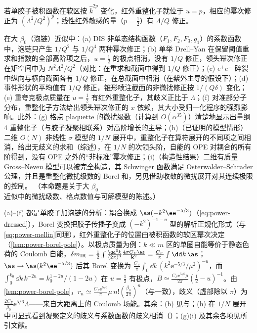 若单胶子被积函数在软区按 $\hat k^{2p}$ 变化，红外重整化子就位于 $u=p$，相应的幂次修正为 $(\Lambda^2/Q^2)^p$；线性红外敏感的量（$p=\frac12$）有 $\Lambda/Q$ 修正。

\begin{proposition}\label{prop:power-renormalon-examples}
在大 $\beta_0$（泡链）近似中：(a) DIS 非单态结构函数（$F_1,F_2,F_3,g_1$）的系数函数中，泡链只产生 $1/Q^2$ 与 $1/Q^4$ 两种幂次修正\cite{DasguptaWebber1996}；(b) 单举 Drell--Yan 在保留阈值重求和指数的全部高阶项之后，$u=\frac12$ 的极点相消，没有 $1/Q$ 修正，领头幂次修正在矩空间中为 $N^2\Lambda^2/Q^2$\cite{BenekeBraun1995b}（对比：\cite{Korchemsky:1994is}在重求和截面中得到 $1/Q$ 修正）；(c) $e^+e^-$ 碎裂中纵向与横向截面各有 $1/Q$ 修正，在总截面中相消（在紫外主导的假设下）\cite{BenekeBraunMagnea1997}；(d) 事件形状的平均值有 $1/Q$ 修正\cite{DokshitzerWebber1995}，锥形喷注截面的非微扰修正按 $1/(Q\delta)$ 变化\cite{Korchemsky:1994is}；(e) 重夸克极点质量在 $u=\frac12$ 有红外重整化子，其歧义正比于 $\Lambda$\cite{Bigi:1994em,Beneke:1994sw}；(f) 对准部分子分布，重整化子方法给出领头幂次修正的 $x$ 依赖，其大小受归一化程序的强烈影响\cite{Braun:2018brg}。此外：(g) 格点 plaquette 的微扰级数（计算到 $O(\alpha^{35})$）清楚地显示出量纲 4 重整化子（与胶子凝聚相联系）对高阶增长的主导\cite{Bali:2014fea}；(h)（已证明的模型情形）二维 $O(N)$ 非线性 $\sigma$ 模型的 $1/N$ 展开中，重整化子在算符展开的不同项之间相消，给出无歧义的求和\cite{David:1982qv}（综述\cite{Novikov:1984ac}），在 $1/N$ 的次领头阶，自能的 OPE 对耦合的所有阶得到，没有 OPE 之外的“非标准”幂次修正\cite{Beneke:1998eq}；(i)（构造性结果）二维有质量 Gross--Neveu 模型可以被完全构造，其 Schwinger 函数满足 Osterwalder--Schrader 公理，并且是重整化微扰级数的 Borel 和\cite{Feldman:1986ax}，另见借助收敛的微扰展开对其连续极限的控制\cite{Gawedzki:1985ez}。
（本命题是关于大 $\beta_0$ 近似中的微扰级数、格点数值与可解模型的陈述。）
\end{proposition}

\begin{proofsketch}
(a)--(f) 都是单胶子加泡链的分析：耦合换成 $\as(-k^2\ee^{-5/3})$（\eqref{eq:power-dressed}），Borel 变换把胶子传播子变成 $(-k^2)^{-1-u}$ 型的解析正规化形式（与\eqref{eq:power-mellin}同理），红外重整化子的位置由被积函数的软区幂次决定（\cref{lem:power-borel-pole}）。以极点质量为例：$k\ll m$ 区的单圈自能等价于静态色荷的 Coulomb 自能，$\delta m_{\mathrm{IR}}=\frac12\int\frac{\dd^3k}{(2\pi)^3}\frac{4\pi C_F\as}{\mathbf k^2}=\frac{C_F}{\pi}\int\dd k\,\as$；$\as\to\as(k^2\ee^{-5/3})$ 后其 Borel 变换为 $\frac{C_F}{\pi}\int_0\dd k\,(k^2\ee^{-5/3}/\mu^2)^{-u}$，而 $\int_0^{k_0}\dd k\,k^{-2u}=k_0^{1-2u}/(1-2u)$ 在 $u=\frac12$ 有极点，$B\simeq\frac{C_F\ee^{5/6}\mu}{2\pi}(\frac12-u)^{-1}$。由\cref{lem:power-borel-pole}，$r_n\simeq\frac{C_F\ee^{5/6}}{\pi}\mu\,n!(\frac{\beta_0}{2\pi})^n$（与\cite[式~(5.84)]{Beneke1999}一致），歧义（虚部除以 $\pi$）为 $\frac{2C_F}{\beta_0}\ee^{5/6}\Lambda$——来自大距离上的 Coulomb 场能。其余：(b) 见\cite{BenekeBraun1995b}与\cite[第~5.3.4~节]{Beneke1999}；(h) 在 $1/N$ 展开中可显式看到凝聚定义的歧义与系数函数的歧义相消\cite{David:1982qv,Beneke:1998eq}（\cite[第~4.1~节]{Beneke1999}）；(g)(i) 及其余各项见所引文献。
\end{proofsketch}


